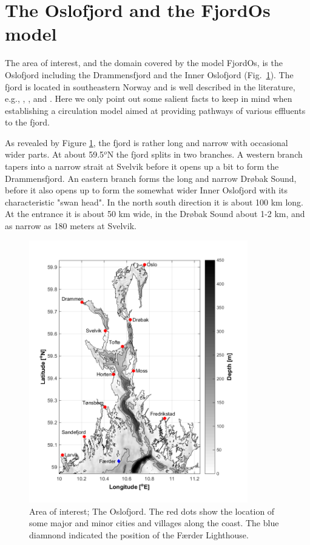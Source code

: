 \section{The Oslofjord and the FjordOs model}

The area of interest, and the domain covered by the model FjordOs, is the Oslofjord including the Drammensfjord and the Inner Oslofjord (Fig.~\ref{fig:kart}). The fjord is located in southeastern Norway and is well described in the literature, e.g., \cite{baalsrud:2002}, \cite{roed:etal:2016}, and \cite{hjelm:etal:2017}. Here we only point out some salient facts to keep in mind when establishing a circulation model aimed at providing pathways of various effluents to the fjord.

As revealed by Figure \ref{fig:kart}, the fjord is rather long and narrow with occasional wider parts. At about 59.5$^o$N the fjord splits in two branches. A western branch tapers into a narrow strait at Svelvik before it opens up a bit to form the Drammensfjord. An eastern branch forms the long and narrow Dr{\o}bak Sound, before it also opens up to form the somewhat wider Inner Oslofjord with its characteristic "swan head". In the north south direction it is about 100 km long. At the entrance it is about 50 km wide, in the Dr{\o}bak Sound about 1-2 km, and as narrow as 180 meters at Svelvik.


\begin{figure}[htb]
\centerline{
\includegraphics*[trim=0cm 0.9cm 0cm 0cm,clip=true,width=0.85\textwidth]{Figurer/kart}
}
\caption{\small
Area of interest; The Oslofjord. The red dots show the location of some major and minor cities and villages along the coast. The blue diamnond indicated the position of the F{\ae}rder Lighthouse.
}
\label{fig:kart}
\end{figure}

